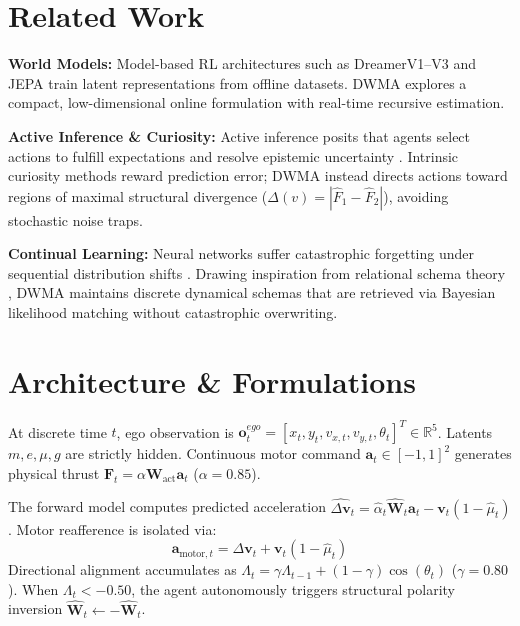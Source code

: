 \documentclass[10pt,twocolumn,a4paper]{article}
\begin{document}
\section{Related Work}
\textbf{World Models:} Model-based RL architectures such as DreamerV1--V3 \cite{hafner2020,hafner2023} and JEPA \cite{lecun2022} train latent representations from offline datasets. DWMA explores a compact, low-dimensional online formulation with real-time recursive estimation.

\textbf{Active Inference \& Curiosity:} Active inference posits that agents select actions to fulfill expectations and resolve epistemic uncertainty \cite{friston2015,friston2017,buckley2021}. Intrinsic curiosity methods \cite{oudeyer2007,pathak2017,burda2018} reward prediction error; DWMA instead directs actions toward regions of maximal structural divergence ($\Delta(v) = |\hat{F}_1 - \hat{F}_2|$), avoiding stochastic noise traps.

\textbf{Continual Learning:} Neural networks suffer catastrophic forgetting under sequential distribution shifts \cite{french1999,kirkpatrick2017}. Drawing inspiration from relational schema theory \cite{whittington2020}, DWMA maintains discrete dynamical schemas that are retrieved via Bayesian likelihood matching without catastrophic overwriting.

\section{Architecture \& Formulations}
At discrete time $t$, ego observation is $\mathbf{o}_t^{ego} = [x_t, y_t, v_{x,t}, v_{y,t}, \theta_t]^T \in \mathbb{R}^5$. Latents $m, e, \mu, g$ are strictly hidden. Continuous motor command $\mathbf{a}_t \in [-1, 1]^2$ generates physical thrust $\mathbf{F}_t = \alpha \mathbf{W}_{\text{act}} \mathbf{a}_t$ ($\alpha = 0.85$). 

The forward model computes predicted acceleration $\hat{\Delta \mathbf{v}}_t = \hat{\alpha}_t \hat{\mathbf{W}}_t \mathbf{a}_t - \mathbf{v}_t (1 - \hat{\mu}_t)$. Motor reafference is isolated via:
\begin{equation}
\mathbf{a}_{\text{motor}, t} = \Delta \mathbf{v}_t + \mathbf{v}_t (1 - \hat{\mu}_t)
\end{equation}
Directional alignment accumulates as $\Lambda_t = \gamma \Lambda_{t-1} + (1 - \gamma) \cos(\theta_t)$ ($\gamma = 0.80$). When $\Lambda_t < -0.50$, the agent autonomously triggers structural polarity inversion $\hat{\mathbf{W}}_t \leftarrow -\hat{\mathbf{W}}_t$.
\end{document}

